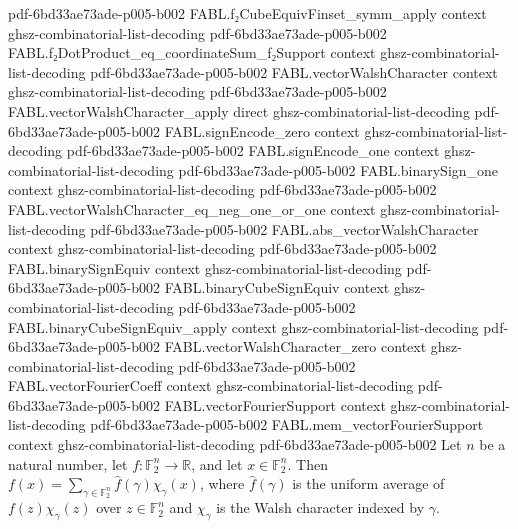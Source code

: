 \begin{theorem}
  {pdf-6bd33ae73ade-p005-b002}
\proofstep
  {FABL.f₂CubeEquivFinset_symm_apply}
  {context}
  {ghsz-combinatorial-list-decoding}
  {pdf-6bd33ae73ade-p005-b002}
\proofstep
  {FABL.f₂DotProduct_eq_coordinateSum_f₂Support}
  {context}
  {ghsz-combinatorial-list-decoding}
  {pdf-6bd33ae73ade-p005-b002}
\proofstep
  {FABL.vectorWalshCharacter}
  {context}
  {ghsz-combinatorial-list-decoding}
  {pdf-6bd33ae73ade-p005-b002}
\proofstep
  {FABL.vectorWalshCharacter_apply}
  {direct}
  {ghsz-combinatorial-list-decoding}
  {pdf-6bd33ae73ade-p005-b002}
\proofstep
  {FABL.signEncode_zero}
  {context}
  {ghsz-combinatorial-list-decoding}
  {pdf-6bd33ae73ade-p005-b002}
\proofstep
  {FABL.signEncode_one}
  {context}
  {ghsz-combinatorial-list-decoding}
  {pdf-6bd33ae73ade-p005-b002}
\proofstep
  {FABL.binarySign_one}
  {context}
  {ghsz-combinatorial-list-decoding}
  {pdf-6bd33ae73ade-p005-b002}
\proofstep
  {FABL.vectorWalshCharacter_eq_neg_one_or_one}
  {context}
  {ghsz-combinatorial-list-decoding}
  {pdf-6bd33ae73ade-p005-b002}
\proofstep
  {FABL.abs_vectorWalshCharacter}
  {context}
  {ghsz-combinatorial-list-decoding}
  {pdf-6bd33ae73ade-p005-b002}
\proofstep
  {FABL.binarySignEquiv}
  {context}
  {ghsz-combinatorial-list-decoding}
  {pdf-6bd33ae73ade-p005-b002}
\proofstep
  {FABL.binaryCubeSignEquiv}
  {context}
  {ghsz-combinatorial-list-decoding}
  {pdf-6bd33ae73ade-p005-b002}
\proofstep
  {FABL.binaryCubeSignEquiv_apply}
  {context}
  {ghsz-combinatorial-list-decoding}
  {pdf-6bd33ae73ade-p005-b002}
\proofstep
  {FABL.vectorWalshCharacter_zero}
  {context}
  {ghsz-combinatorial-list-decoding}
  {pdf-6bd33ae73ade-p005-b002}
\proofstep
  {FABL.vectorFourierCoeff}
  {context}
  {ghsz-combinatorial-list-decoding}
  {pdf-6bd33ae73ade-p005-b002}
\proofstep
  {FABL.vectorFourierSupport}
  {context}
  {ghsz-combinatorial-list-decoding}
  {pdf-6bd33ae73ade-p005-b002}
\proofstep
  {FABL.mem_vectorFourierSupport}
  {context}
  {ghsz-combinatorial-list-decoding}
  {pdf-6bd33ae73ade-p005-b002}
Let $n$ be a natural number, let $f:\mathbb F_2^n\to\mathbb R$, and let $x\in\mathbb
F_2^n$. Then $f(x)=\sum_{\gamma\in\mathbb F_2^n}\widehat f(\gamma)\chi_\gamma(x)$, where
$\widehat f(\gamma)$ is the uniform average of $f(z)\chi_\gamma(z)$ over $z\in\mathbb
F_2^n$ and $\chi_\gamma$ is the Walsh character indexed by $\gamma$.
\end{theorem}

